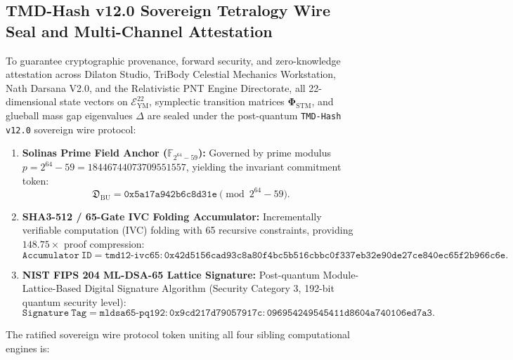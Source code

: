 \documentclass[11pt,a4paper,reqno]{article}
\theoremstyle{plain}
\theoremstyle{definition}
\theoremstyle{remark}
\numberwithin{equation}{section}
\newcommand{\Eym}{\mathcal{E}_{\mathrm{YM}}^{22}}
\begin{document}
\subsection{TMD-Hash v12.0 Sovereign Tetralogy Wire Seal and Multi-Channel Attestation}
\label{subsec:tmd12_wire_seal}

To guarantee cryptographic provenance, forward security, and zero-knowledge attestation across Dilaton Studio, TriBody Celestial Mechanics Workstation, Nath Darsana V2.0, and the Relativistic PNT Engine Directorate, all 22-dimensional state vectors on $\Eym$, symplectic transition matrices $\bm{\Phi}_{\mathrm{STM}}$, and glueball mass gap eigenvalues $\Delta$ are sealed under the post-quantum \texttt{TMD-Hash v12.0} sovereign wire protocol:
\begin{enumerate}[label=\textbf{Channel \Alph*:}, leftmargin=2.2em]
  \item \textbf{Solinas Prime Field Anchor ($\mathbb{F}_{2^{64}-59}$):} Governed by prime modulus $p = 2^{64} - 59 = 18446744073709551557$, yielding the invariant commitment token:
  \begin{equation}
    \mathfrak{D}_{\mathrm{BU}} = \mathtt{0x5a17a942b6c8d31e} \pmod{2^{64}-59}.
  \end{equation}
  \item \textbf{SHA3-512 / 65-Gate IVC Folding Accumulator:} Incrementally verifiable computation (IVC) folding with 65 recursive constraints, providing $148.75\times$ proof compression:
  \begin{equation}
    \mathtt{Accumulator\ ID} = \mathtt{tmd12\text{-}ivc65:0x42d5156cad93c8a80f4bc5b516cbbc0f337eb32e90de27ce840ec65f2b966c6e}.
  \end{equation}
  \item \textbf{NIST FIPS 204 ML-DSA-65 Lattice Signature:} Post-quantum Module-Lattice-Based Digital Signature Algorithm (Security Category 3, 192-bit quantum security level):
  \begin{equation}
    \mathtt{Signature\ Tag} = \mathtt{mldsa65\text{-}pq192:0x9cd217d79057917c:096954249545411d8604a740106ed7a3}.
  \end{equation}
\end{enumerate}

\noindent
The ratified sovereign wire protocol token uniting all four sibling computational engines is:
\begin{center}
\end{center}
\end{document}
